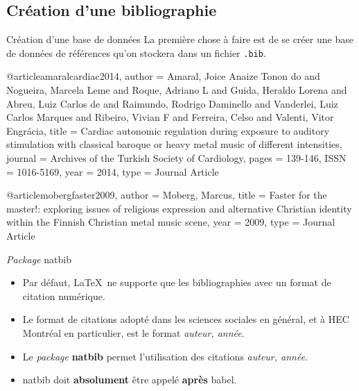 \subsection{Création d'une bibliographie}

\begin{frame}[fragile]{Création d'une base de données}
	La première chose à faire est de se créer une base de données de références qu'on stockera dans un fichier \texttt{.bib}.
	
\begin{codesource}
	
	@article{amaralcardiac2014,
		author = {Amaral, Joice Anaize Tonon do and Nogueira, Marcela Leme and Roque, Adriano L 
			and Guida, Heraldo Lorena and Abreu, Luiz Carlos de and Raimundo, Rodrigo Daminello 
			and Vanderlei, Luiz Carlos Marques and Ribeiro, Vivian F and Ferreira, Celso and 
			Valenti, Vitor Engrácia},
		title = {Cardiac autonomic regulation during exposure to auditory stimulation with classical
			baroque or heavy metal music of different intensities},
		journal = {Archives of the Turkish Society of Cardiology},
		pages = {139-146},
		ISSN = {1016-5169},
		year = {2014},
		type = {Journal Article}
	}
	
	@article{mobergfaster2009,
		author = {Moberg, Marcus},
		title = {Faster for the master!: exploring issues of religious expression and alternative
			Christian identity within the Finnish Christian metal music scene},
		year = {2009},
		type = {Journal Article}
	}
\end{codesource}
\end{frame}

\begin{frame}[fragile]{\emph{Package} natbib}
	\begin{itemize}
		\item Par défaut, \LaTeX\ ne supporte que les bibliographies avec un format de citation numérique.
		\item Le format de citations adopté dans les sciences sociales en général, et à HEC Montréal en particulier, est le format \emph{auteur, année}.
		\item Le \emph{package} \textbf{natbib} permet l'utilisation des citations \emph{auteur, année}.

		\pause
		
		\item natbib doit \textbf{absolument} être appelé \textbf{après} babel.
	\end{itemize}
\end{frame}

